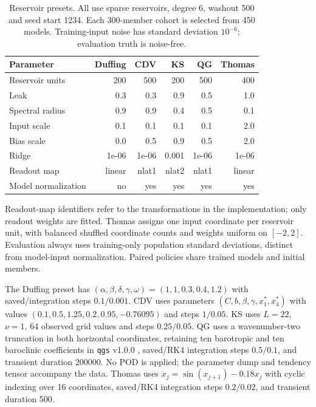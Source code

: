 \documentclass[gmd,manuscript]{copernicus}
\begin{document}
\begin{table}[htbp]\caption{Reservoir presets. All use sparse reservoirs, degree 6, washout 500 and seed start 1234. Each 300-member cohort is selected from 450 models. Training-input noise has standard deviation $10^{-6}$; evaluation truth is noise-free.}\label{tab:v4-training}
\centering\small\begin{tabular}{lrrrrr}\toprule
Parameter & Duffing & CDV & KS & QG & Thomas\\\midrule
Reservoir units & 200 & 500 & 200 & 500& 400\\
Leak & 0.3 & 0.3 & 0.9 & 0.5& 1.0\\
Spectral radius & 0.9 & 0.9 & 0.4 & 0.5& 0.1\\
Input scale & 0.1 & 0.1 & 0.1 & 0.1& 2.0\\
Bias scale & 0.0 & 0.5 & 0.9 & 0.5& 2.0\\
Ridge & 1e-06 & 1e-06 & 0.001 & 1e-06& 1e-06\\
Readout map & linear & nlat1 & nlat2 & nlat1& linear\\
Model normalization & no & yes & yes & yes& yes\\
\bottomrule\end{tabular}\end{table}
Readout-map identifiers refer to the transformations in the implementation; only readout weights are fitted. Thomas assigns one input coordinate per reservoir unit, with balanced shuffled coordinate counts and weights uniform on $[-2,2]$. Evaluation always uses training-only population standard deviations, distinct from model-input normalization. Paired policies share trained models and initial members.

The Duffing preset has $(\alpha,\beta,\delta,\gamma,\omega)=(1,1,0.3,0.4,1.2)$ with saved/integration steps $0.1/0.001$. CDV uses parameters $(C,b,\beta,\gamma,x_1^*,x_4^*)$ with values $(0.1,0.5,1.25,0.2,0.95,-0.76095)$ and steps $1/0.05$. KS uses $L=22$, $\nu=1$, 64 observed grid values and steps $0.25/0.05$. QG uses a wavenumber-two truncation in both horizontal coordinates, retaining ten barotropic and ten baroclinic coefficients in \texttt{qgs} v1.0.0 \citep{demaeyer2020qgs}, saved/RK4 integration steps $0.5/0.1$, and transient duration 200000. No POD is applied; the parameter dump and tendency tensor accompany the data. Thomas uses $\dot x_j=\sin(x_{j+1})-0.18x_j$ with cyclic indexing over 16 coordinates, saved/RK4 integration steps $0.2/0.02$, and transient duration 500. 
\end{document}
